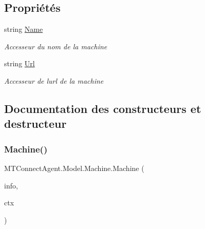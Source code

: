 \subsection*{Propriétés}
\begin{DoxyCompactItemize}
\item 
string \mbox{\hyperlink{class_m_t_connect_agent_1_1_model_1_1_machine_aa70c7db4903ee28733408db9d6a2bd4a}{Name}}
\begin{DoxyCompactList}\small\item\em Accesseur du nom de la machine \end{DoxyCompactList}\item 
string \mbox{\hyperlink{class_m_t_connect_agent_1_1_model_1_1_machine_ad31a7be0d27dbfeb749bbf6874546a30}{Url}}
\begin{DoxyCompactList}\small\item\em Accesseur de l\textquotesingle{}url de la machine \end{DoxyCompactList}\end{DoxyCompactItemize}


\subsection{Documentation des constructeurs et destructeur}
\mbox{\label{class_m_t_connect_agent_1_1_model_1_1_machine_aa5b3b34432aa1586c337c6b46b17d0d9}} 
\subsubsection{\texorpdfstring{Machine()}{Machine()}\hspace{0.1cm}{\footnotesize\ttfamily [1/2]}}
{\footnotesize\ttfamily M\+T\+Connect\+Agent.\+Model.\+Machine.\+Machine (\begin{DoxyParamCaption}\item[{Serialization\+Info}]{info,  }\item[{Streaming\+Context}]{ctx }\end{DoxyParamCaption})\hspace{0.3cm}{\ttfamily [inline]}}

